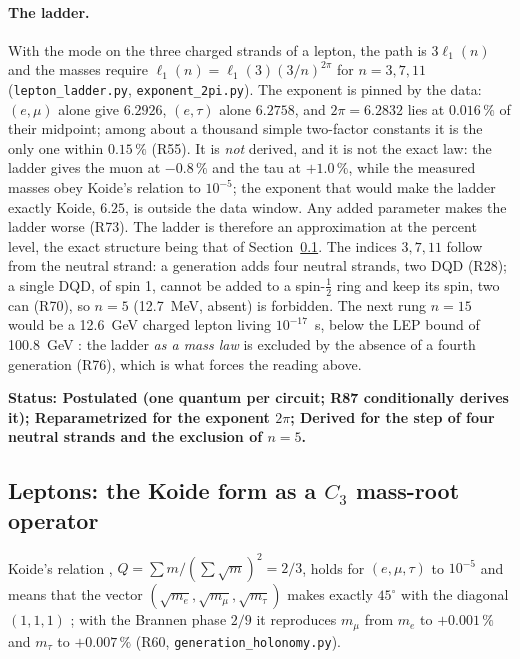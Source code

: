 \documentclass[11pt,a4paper]{article}
\theoremstyle{plain}
\theoremstyle{remark}
\newcommand{\lone}{\ensuremath{\ell_1}}
\newcommand{\status}[1]{\medskip\noindent\textbf{Status: #1.}\ }
\begin{document}
\paragraph{The ladder.} With the mode on the three charged strands of a lepton, the path is
$3\lone(n)$ and the masses require $\lone(n) = \lone(3)(3/n)^{2\pi}$ for $n = 3, 7, 11$
(\texttt{lepton\_ladder.py}, \texttt{exponent\_2pi.py}). The exponent is pinned by the data:
$(e,\mu)$ alone give $6.2926$, $(e,\tau)$ alone $6.2758$, and $2\pi = 6.2832$ lies at $0.016\,\%$
of their midpoint; among about a thousand simple two-factor constants it is the only one within
$0.15\,\%$ (R55). It is \emph{not} derived, and it is not the exact law: the ladder gives the muon
at $-0.8\,\%$ and the tau at $+1.0\,\%$, while the measured masses obey Koide's relation to
$10^{-5}$; the exponent that would make the ladder exactly Koide, $6.25$, is outside the data
window. Any added parameter makes the ladder worse (R73). The ladder is therefore an
approximation at the percent level, the exact structure being that of Section~\ref{sec:koide}.
The indices $3, 7, 11$ follow from the neutral strand: a generation adds four neutral strands, two
DQD (R28); a single DQD, of spin 1, cannot be added to a spin-$\tfrac12$ ring and keep its spin,
two can (R70), so $n = 5$ (12.7~MeV, absent) is forbidden. The next rung $n = 15$ would be a
12.6~GeV charged lepton living $10^{-17}$~s, below the LEP bound of 100.8~GeV \cite{pdg}: the
ladder \emph{as a mass law} is excluded by the absence of a fourth generation (R76), which is what
forces the reading above.

\status{Postulated (one quantum per circuit; R87 conditionally derives it); Reparametrized for the
exponent $2\pi$; Derived for the step of four neutral strands and the exclusion of $n = 5$}

\subsection{Leptons: the Koide form as a $C_3$ mass-root operator}\label{sec:koide}

Koide's relation \cite{koide}, $Q = \sum m/(\sum\sqrt m)^2 = 2/3$, holds for $(e, \mu, \tau)$ to
$10^{-5}$ and means that the vector $(\sqrt{m_e}, \sqrt{m_\mu}, \sqrt{m_\tau})$ makes exactly
$45^\circ$ with the diagonal $(1,1,1)$ \cite{foot}; with the Brannen phase $2/9$ \cite{brannen} it
reproduces $m_\mu$ from $m_e$ to $+0.001\,\%$ and $m_\tau$ to $+0.007\,\%$ (R60,
\texttt{generation\_holonomy.py}).
\end{document}
